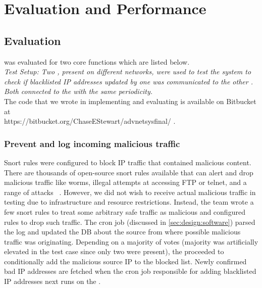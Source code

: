 \section{Evaluation and Performance}
\label{sec:eval}
\subsection{Evaluation}


\sysname was evaluated for two core functions which are listed below.\\
\textit{Test Setup: Two \nodenames, present on different networks, were used to test the system to check if blacklisted IP addresses updated by one \nodename was communicated to the other \nodename. Both \nodenames connected to the \servname with the same periodicity.} \\
The code that we wrote in implementing and evaluating \sysname is available on Bitbucket at \\ https://bitbucket.org/ChaseEStewart/advnetsysfinal/ \cite{us}.
\subsubsection{Prevent and log incoming malicious traffic}
\label{sec:eval:preventout}

 Snort rules were configured to block IP traffic that contained malicious content. There are thousands of open-source snort rules available that can alert and drop malicious traffic like worms, illegal attempts at accessing FTP or telnet, and a range of attacks ~\cite{Roesch:1999:SLI:1039834.1039864}. However, we did not wish to receive actual malicious traffic in testing due to infrastructure and resource restrictions. Instead, the team wrote a few snort rules to treat some arbitrary safe traffic as malicious and configured rules to drop such traffic. 
The cron job (discussed in \ref{sec:design:software}) parsed the log and updated the DB about the source from where possible malicious traffic was originating. Depending on a majority of votes (majority was artificially elevated in the test case since only two \nodenames were present), the \servname proceeded to conditionally add the malicious source IP to the blocked list. Newly confirmed bad IP addresses are fetched when the cron job responsible for adding blacklisted IP addresses next runs on the \nodenames. %

